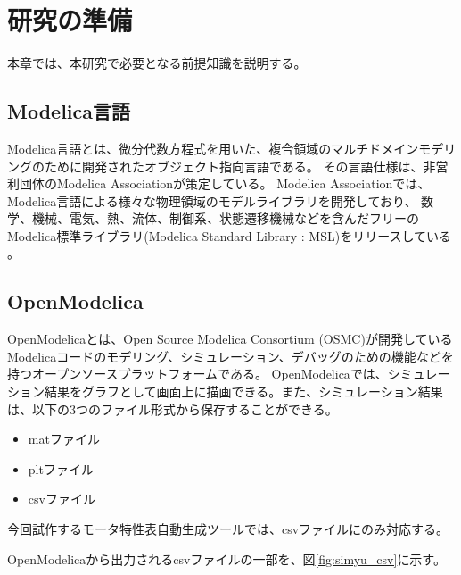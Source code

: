 \chapter{研究の準備}\label{cha:Preparation}
本章では、本研究で必要となる前提知識を説明する。
\section{Modelica言語}\label{modelica}
Modelica言語とは、微分代数方程式を用いた、複合領域のマルチドメインモデリングのために開発されたオブジェクト指向言語である\cite{modelicaモデルベース本}。
その言語仕様は、非営利団体のModelica Associationが策定している。
Modelica Associationでは、Modelica言語による様々な物理領域のモデルライブラリを開発しており、
数学、機械、電気、熱、流体、制御系、状態遷移機械などを含んだフリーのModelica標準ライブラリ(Modelica Standard Library : MSL)をリリースしている
\cite{modelicaモデルベース本}。
\section{OpenModelica}\label{OM}
OpenModelicaとは、Open Source Modelica Consortium (OSMC)が開発しているModelicaコードのモデリング、シミュレーション、デバッグのための機能などを
持つオープンソースプラットフォームである\cite{fritzson2006openmodelica}。
OpenModelicaでは、シミュレーション結果をグラフとして画面上に描画できる。また、シミュレーション結果は、以下の3つのファイル形式から保存することができる。
\begin{itemize}
    \item matファイル
    \item pltファイル
    \item csvファイル
\end{itemize}

今回試作するモータ特性表自動生成ツールでは、csvファイルにのみ対応する。

OpenModelicaから出力されるcsvファイルの一部を、図\ref{fig:simyu_csv}に示す。

